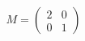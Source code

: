 \documentclass[preview]{standalone}
\begin{document}
\begin{align*}
M = \begin{pmatrix} 2 & 0 \\ 0 & 1 \end{pmatrix}
\end{align*}
\end{document}
